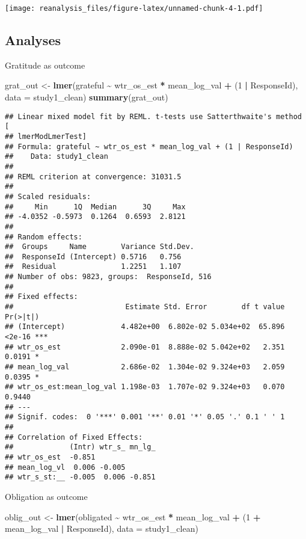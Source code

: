 \documentclass[
]{article}
\newenvironment{Shaded}{\begin{snugshade}}{\end{snugshade}}
\newcommand{\AttributeTok}[1]{\textcolor[rgb]{0.13,0.29,0.53}{#1}}
\newcommand{\DecValTok}[1]{\textcolor[rgb]{0.00,0.00,0.81}{#1}}
\newcommand{\FunctionTok}[1]{\textcolor[rgb]{0.13,0.29,0.53}{\textbf{#1}}}
\newcommand{\NormalTok}[1]{#1}
\newcommand{\OtherTok}[1]{\textcolor[rgb]{0.56,0.35,0.01}{#1}}
\newcommand{\SpecialCharTok}[1]{\textcolor[rgb]{0.81,0.36,0.00}{\textbf{#1}}}
\begin{document}
\texttt{[image: reanalysis\_files/figure-latex/unnamed-chunk-4-1.pdf]}

\hypertarget{analyses}{%
\subsection{Analyses}\label{analyses}}

Gratitude as outcome

\begin{Shaded}
\begin{Highlighting}[]
\NormalTok{grat\_out }\OtherTok{\textless{}{-}} \FunctionTok{lmer}\NormalTok{(grateful }\SpecialCharTok{\textasciitilde{}}\NormalTok{ wtr\_os\_est }\SpecialCharTok{*}\NormalTok{ mean\_log\_val }\SpecialCharTok{+}\NormalTok{ (}\DecValTok{1} \SpecialCharTok{|}\NormalTok{ ResponseId), }\AttributeTok{data =}\NormalTok{ study1\_clean)}
\FunctionTok{summary}\NormalTok{(grat\_out)}
\end{Highlighting}
\end{Shaded}

\begin{verbatim}
## Linear mixed model fit by REML. t-tests use Satterthwaite's method [
## lmerModLmerTest]
## Formula: grateful ~ wtr_os_est * mean_log_val + (1 | ResponseId)
##    Data: study1_clean
## 
## REML criterion at convergence: 31031.5
## 
## Scaled residuals: 
##     Min      1Q  Median      3Q     Max 
## -4.0352 -0.5973  0.1264  0.6593  2.8121 
## 
## Random effects:
##  Groups     Name        Variance Std.Dev.
##  ResponseId (Intercept) 0.5716   0.756   
##  Residual               1.2251   1.107   
## Number of obs: 9823, groups:  ResponseId, 516
## 
## Fixed effects:
##                          Estimate Std. Error        df t value Pr(>|t|)    
## (Intercept)             4.482e+00  6.802e-02 5.034e+02  65.896   <2e-16 ***
## wtr_os_est              2.090e-01  8.888e-02 5.042e+02   2.351   0.0191 *  
## mean_log_val            2.686e-02  1.304e-02 9.324e+03   2.059   0.0395 *  
## wtr_os_est:mean_log_val 1.198e-03  1.707e-02 9.324e+03   0.070   0.9440    
## ---
## Signif. codes:  0 '***' 0.001 '**' 0.01 '*' 0.05 '.' 0.1 ' ' 1
## 
## Correlation of Fixed Effects:
##             (Intr) wtr_s_ mn_lg_
## wtr_os_est  -0.851              
## mean_log_vl  0.006 -0.005       
## wtr_s_st:__ -0.005  0.006 -0.851
\end{verbatim}

Obligation as outcome

\begin{Shaded}
\begin{Highlighting}[]
\NormalTok{oblig\_out }\OtherTok{\textless{}{-}} \FunctionTok{lmer}\NormalTok{(obligated }\SpecialCharTok{\textasciitilde{}}\NormalTok{ wtr\_os\_est }\SpecialCharTok{*}\NormalTok{ mean\_log\_val }\SpecialCharTok{+}\NormalTok{ (}\DecValTok{1} \SpecialCharTok{+}\NormalTok{ mean\_log\_val }\SpecialCharTok{|}\NormalTok{ ResponseId), }\AttributeTok{data =}\NormalTok{ study1\_clean)}
\end{Highlighting}
\end{Shaded}
\end{document}

